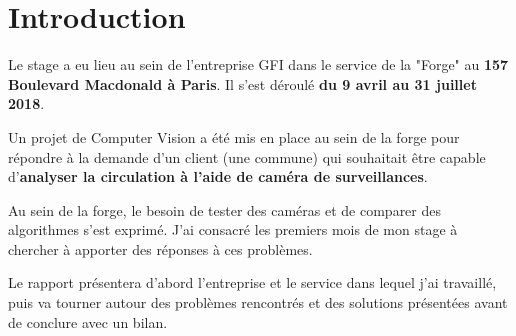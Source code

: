 \section*{Introduction}


Le stage a eu lieu au sein de l'entreprise GFI dans le service de la "Forge" au \textbf{157 Boulevard Macdonald à Paris}. Il s'est déroulé \textbf{du 9 avril au 31 juillet 2018}.

Un projet de Computer Vision a été mis en place au sein de la forge pour répondre à la demande d'un client (une commune) qui souhaitait être capable d'\textbf{analyser la circulation à l'aide de caméra de surveillances}.

Au sein de la forge, le besoin de tester des caméras et de comparer des algorithmes s'est exprimé. J'ai consacré les premiers mois de mon stage à chercher à apporter des réponses à ces problèmes. 

Le rapport présentera d’abord l'entreprise et le service dans lequel j'ai travaillé, puis va tourner autour des problèmes rencontrés et des solutions présentées avant de conclure avec un bilan.